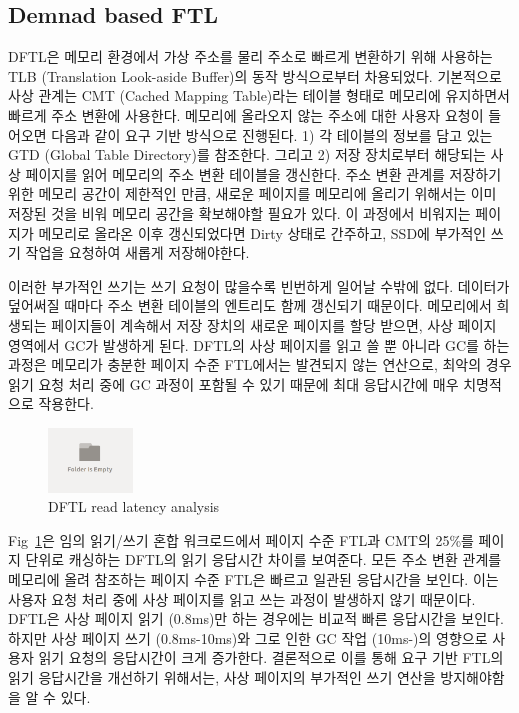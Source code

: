 \documentclass[conference]{IEEEtran}
\begin{document}
\subsection{Demnad based FTL}

DFTL은 메모리 환경에서 가상 주소를 물리 주소로 빠르게 변환하기 위해 사용하는
TLB (Translation Look-aside Buffer)의 동작 방식으로부터 차용되었다. 기본적으로 사상 관계는
CMT (Cached Mapping Table)라는 테이블 형태로 메모리에 유지하면서 빠르게 주소 변환에 사용한다.
메모리에 올라오지 않는 주소에 대한 사용자 요청이 들어오면 다음과 같이 요구 기반 방식으로 진행된다.
1) 각 테이블의 정보를 담고 있는 GTD (Global Table Directory)를 참조한다. 그리고 2) 저장 장치로부터
해당되는 사상 페이지를 읽어 메모리의 주소 변환 테이블을 갱신한다. 주소 변환 관계를 저장하기 위한
메모리 공간이 제한적인 만큼, 새로운 페이지를 메모리에 올리기 위해서는 이미 저장된 것을 비워
메모리 공간을 확보해야할 필요가 있다. 이 과정에서 비워지는 페이지가 메모리로 올라온 이후 갱신되었다면
Dirty 상태로 간주하고, SSD에 부가적인 쓰기 작업을 요청하여 새롭게 저장해야한다. \par

이러한 부가적인 쓰기는 쓰기 요청이 많을수록 빈번하게 일어날 수밖에 없다. 데이터가 덮어써질 때마다
주소 변환 테이블의 엔트리도 함께 갱신되기 때문이다. 메모리에서 희생되는 페이지들이 계속해서
저장 장치의 새로운 페이지를 할당 받으면, 사상 페이지 영역에서 GC가 발생하게 된다.
DFTL의 사상 페이지를 읽고 쓸 뿐 아니라 GC를 하는 과정은 메모리가 충분한 페이지 수준 FTL에서는
발견되지 않는 연산으로, 최악의 경우 읽기 요청 처리 중에 GC 과정이 포함될 수 있기 때문에
최대 응답시간에 매우 치명적으로 작용한다. \par

\begin{figure}[h]
	\centering
	\includegraphics[width=0.2\textwidth]{image/bg.png}
	\caption{DFTL read latency analysis}
	\label{fig:DFTL_cdf}
\end{figure}

Fig~\ref{fig:DFTL_cdf}은 임의 읽기/쓰기 혼합 워크로드에서 페이지 수준 FTL과 CMT의 25\%를
페이지 단위로 캐싱하는 DFTL의 읽기 응답시간 차이를 보여준다. 모든 주소 변환 관계를 메모리에 올려
참조하는 페이지 수준 FTL은 빠르고 일관된 응답시간을 보인다. 이는 사용자 요청 처리 중에
사상 페이지를 읽고 쓰는 과정이 발생하지 않기 때문이다. DFTL은 사상 페이지 읽기 (0.8ms)만
하는 경우에는 비교적 빠른 응답시간을 보인다. 하지만 사상 페이지 쓰기 (0.8ms-10ms)와 그로 인한
GC 작업 (10ms-)의 영향으로 사용자 읽기 요청의 응답시간이 크게 증가한다. 결론적으로 이를 통해
요구 기반 FTL의 읽기 응답시간을 개선하기 위해서는, 사상 페이지의 부가적인 쓰기 연산을
방지해야함을 알 수 있다. \par
\end{document}

